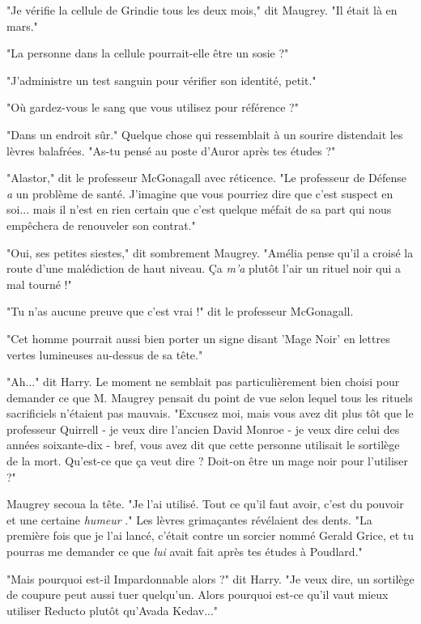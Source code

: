 "Je vérifie la cellule de Grindie tous les deux mois," dit Maugrey. "Il était là en mars."

"La personne dans la cellule pourrait-elle être un sosie ?"

"J'administre un test sanguin pour vérifier son identité, petit."

"Où gardez-vous le sang que vous utilisez pour référence ?"

"Dans un endroit sûr." Quelque chose qui ressemblait à un sourire distendait les lèvres balafrées. "As-tu pensé au poste d'Auror après tes études ?"

"Alastor," dit le professeur McGonagall avec réticence. "Le professeur de Défense \emph{a}  un problème de santé. J'imagine que vous pourriez dire que c'est suspect en soi... mais il n'est en rien certain que c'est quelque méfait de sa part qui nous empêchera de renouveler son contrat."

"Oui, ses petites siestes," dit sombrement Maugrey. "Amélia pense qu'il a croisé la route d'une malédiction de haut niveau. Ça \emph{m'a } plutôt l'air un rituel noir qui a mal tourné !"

"Tu n'as aucune preuve que c'est vrai !" dit le professeur McGonagall.

"Cet homme pourrait aussi bien porter un signe disant 'Mage Noir' en lettres vertes lumineuses au-dessus de sa tête."

"Ah..." dit Harry. Le moment ne semblait pas particulièrement bien choisi pour demander ce que M. Maugrey pensait du point de vue selon lequel tous les rituels sacrificiels n'étaient pas mauvais. "Excusez moi, mais vous avez dit plus tôt que le professeur Quirrell - je veux dire l'ancien David Monroe - je veux dire celui des années soixante-dix - bref, vous avez dit que cette personne utilisait le sortilège de la mort. Qu'est-ce que ça veut dire ? Doit-on être un mage noir pour l'utiliser ?"

Maugrey secoua la tête. "Je l'ai utilisé. Tout ce qu'il faut avoir, c'est du pouvoir et une certaine \emph{humeur} ." Les lèvres grimaçantes révélaient des dents. "La première fois que je l'ai lancé, c'était contre un sorcier nommé Gerald Grice, et tu pourras me demander ce que \emph{lui}  avait fait après tes études à Poudlard."

"Mais pourquoi est-il Impardonnable alors ?" dit Harry. "Je veux dire, un sortilège de coupure peut aussi tuer quelqu'un. Alors pourquoi est-ce qu'il vaut mieux utiliser Reducto plutôt qu'Avada Kedav..."

